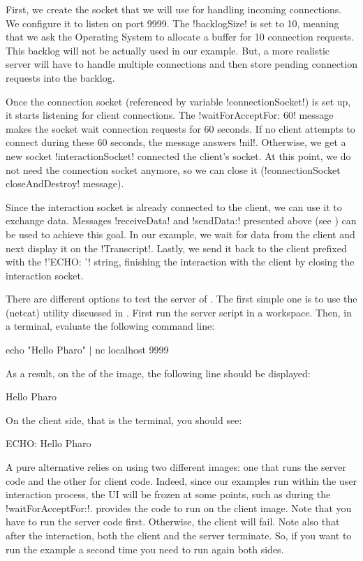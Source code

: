 \documentclass[a4paper,10pt,twoside]{book}
\begin{document}
First, we create the socket that we will use for handling incoming connections.
We configure it to listen on port 9999.
The \ct!backlogSize! is set to 10, meaning that we ask the Operating System to allocate a buffer for 10 connection requests. 
This backlog will not be actually used in our example.
But, a more realistic server will have to handle multiple connections and then store pending connection requests into the backlog.

Once the connection socket (referenced by variable \ct!connectionSocket!) is set up, it starts listening for client connections.
The \ct!waitForAcceptFor: 60! message makes the socket wait connection requests for 60 seconds.
If no client attempts to connect during these 60 seconds, the message answers \ct!nil!.
Otherwise, we get a new socket \ct!interactionSocket! connected the client's socket.
At this point, we do not need the connection socket anymore, so we can close it (\ct!connectionSocket closeAndDestroy! message).

Since the interaction socket is already connected to the client, we can use it to exchange data.
Messages \ct!receiveData! and \ct!sendData:! presented above (see ) can be used to achieve this goal.
In our example, we wait for data from the client and next display it on the \ct!Transcript!. Lastly, we send it back to the client prefixed with the \ct!'ECHO: '! string, finishing the interaction with the client by closing the interaction socket.

There are different options to test the server of .
The first simple one is to use the  (netcat) utility discussed in .
First run the server script in a workspace.
Then, in a terminal, evaluate the following command line: 
\begin{code}[]
	echo "Hello Pharo" | nc localhost 9999
\end{code}

As a result, on the  of the \pharo image, the following line should be displayed:
\begin{code}[]
	Hello Pharo
\end{code}

On the client side, that is the terminal, you should see:
\begin{code}[]
	ECHO: Hello Pharo
\end{code}

A pure \pharo alternative relies on using two different images: one that runs the server code and the other for client code. 
Indeed, since our examples run within the user interaction process, the \pharo UI will be frozen at some points, such as during the \ct!waitForAcceptFor:!.
 provides the code to run on the client image.
Note that you have to run the server code first.
Otherwise, the client will fail.
Note also that after the interaction, both the client and the server terminate.
So, if you want to run the example a second time you need to run again both sides.
\end{document}

